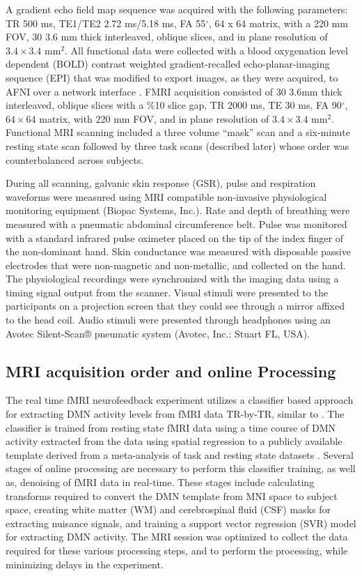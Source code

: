 A gradient echo field map sequence was acquired with the following parameters: TR 500 ms, TE1/TE2 2.72 ms/5.18 ms, FA 55$^\circ$, 64 x 64 matrix, with a 220 mm FOV, 30 3.6 mm thick interleaved, oblique slices, and in plane resolution of $3.4 \times 3.4$ mm$^2$. All functional data were collected with a blood oxygenation level dependent (BOLD) contrast weighted gradient-recalled echo-planar-imaging sequence (EPI) that was modified to export images, as they were acquired, to AFNI over a network interface \cite{Cox1995,LaConte2007}. FMRI acquisition consisted of 30 3.6mm thick interleaved, oblique slices with a \%10 slice gap, TR 2000 ms, TE 30 ms, FA 90$^\circ$, $64 \times 64$ matrix, with 220 mm FOV, and in plane resolution of $3.4 \times 3.4$ mm$^2$. Functional MRI scanning included a three volume “mask” scan and a six-minute resting state scan followed by three task scans (described later) whose order was counterbalanced across subjects.

During all scanning, galvanic skin response (GSR), pulse and respiration waveforms were measured using MRI compatible non-invasive physiological monitoring equipment (Biopac Systems, Inc.). Rate and depth of breathing were measured with a pneumatic abdominal circumference belt. Pulse was monitored with a standard infrared pulse oximeter placed on the tip of the index finger of the non-dominant hand. Skin conductance was measured with disposable passive electrodes that were non-magnetic and non-metallic, and collected on the hand. The physiological recordings were synchronized with the imaging data using a timing signal output from the scanner. Visual stimuli were presented to the participants on a projection screen that they could see through a mirror affixed to the head coil. Audio stimuli were presented through headphones using an Avotec Silent-Scan® pneumatic system (Avotec, Inc.: Stuart FL, USA).

\subsection{MRI acquisition order and online Processing}

The real time fMRI neurofeedback experiment utilizes a classifier based approach for extracting DMN activity levels from fMRI data TR-by-TR, similar to \cite{Craddock2012}. The classifier is trained from resting state fMRI data using a time course of DMN activity extracted from the data using spatial regression to a publicly available template derived from a meta-analysis of task and resting state datasets \cite{Smith2009,fmrib_RSNS}. Several stages of online processing are necessary to perform this classifier training, as well as, denoising of fMRI data in real-time. These stages include calculating transforms required to convert the DMN template from MNI space to subject space, creating white matter (WM) and cerebrospinal fluid (CSF) masks for extracting nuisance signals, and training a support vector regression (SVR) model for extracting DMN activity. The MRI session was optimized to collect the data required for these various processing steps, and to perform the processing, while minimizing delays in the experiment.

